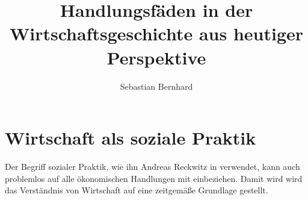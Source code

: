 \documentclass[a4paper]{article}
\begin{document}
\author{Sebastian Bernhard}
\title{Handlungsfäden in der Wirtschaftsgeschichte aus heutiger Perspektive}
\maketitle
\tableofcontents

\section{Wirtschaft als soziale Praktik}

Der Begriff sozialer Praktik, wie ihn Andreas Reckwitz in
\cite{reckwitz2003praktiken} verwendet, kann auch problemlos
auf alle ökonomischen Handlungen mit einbeziehen. Damit wird
wird das Verständnis von Wirtschaft auf eine zeitgemäße
Grundlage gestellt.



 
\end{document}
